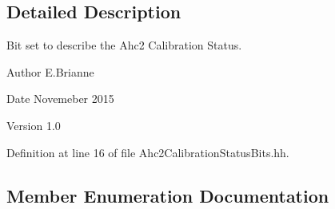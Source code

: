 \subsection{Detailed Description}
Bit set to describe the Ahc2 Calibration Status. \begin{DoxyAuthor}{Author}
E.Brianne 
\end{DoxyAuthor}
\begin{DoxyDate}{Date}
Novemeber 2015 
\end{DoxyDate}
\begin{DoxyVersion}{Version}
1.0 
\end{DoxyVersion}


Definition at line 16 of file Ahc2CalibrationStatusBits.hh.

\subsection{Member Enumeration Documentation}
